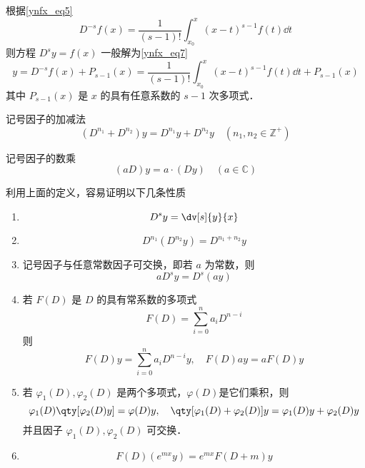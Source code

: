 根据\autoref{ynfx_eq5}~
\begin{equation}
D^{-s}f(x)=\frac{1}{(s-1)!}\int_{x_0}^x(x-t)^{s-1}f(t)\dd t
\end{equation}
则方程 $D^sy=f(x)$ 一般解为\autoref{ynfx_eq7}~
\begin{equation}
y=D^{-s}f(x)+P_{s-1}(x)=\frac{1}{(s-1)!}\int_{x_0}^x(x-t)^{s-1}f(t)\dd t+P_{s-1}(x)
\end{equation}
其中 $P_{s-1}(x)$ 是 $x$ 的具有任意系数的 $s-1$ 次多项式．
\begin{definition}{记号因子的加减法}
\begin{equation}
(D^{n_1}+D^{n_2})y=D^{n_1}y+D^{n_2}y\quad(n_1,n_2\in \mathbb{Z^{+
}})
\end{equation}
\end{definition}
\begin{definition}{记号因子的数乘}
\begin{equation}
(aD)y=a\cdot(Dy)\quad(a\in\mathbb{C})
\end{equation}
\end{definition}
利用上面的定义，容易证明以下几条性质
\begin{enumerate}
\item 
\begin{equation}
D^sy=\dv[s]{y}{x}
\end{equation}
\item 
\begin{equation}
D^{n_1}(D^{n_2}y)=D^{n_1+n_2}y
\end{equation}
\item 记号因子与任意常数因子可交换，即若 $a$ 为常数，则
\begin{equation}
aD^sy=D^s(ay)
\end{equation}
\item 若 $F(D)$ 是 $D$ 的具有常系数的多项式
\begin{equation}
F(D)=\sum_{i=0}^{n}a_iD^{n-i}
\end{equation}
则
\begin{equation}
F(D)y=\sum_{i=0}^{n}a_iD^{n-i}y,\quad F(D)ay=aF(D)y
\end{equation}
\item 若 $\varphi_1(D),\varphi_2(D)$ 是两个多项式，$\varphi(D)$是它们乘积，则
\begin{equation}
\varphi_1(D)\qty[\varphi_2(D)y]=\varphi(D)y,\quad \qty[\varphi_1(D)+\varphi_2(D)]y=\varphi_1(D)y+\varphi_2(D)y
\end{equation}
并且因子 $\varphi_1(D),\varphi_2(D)$ 可交换．
\item \begin{equation}\label{Sign_eq1}
F(D)(e^{mx}y)=e^{mx}F(D+m)y
\end{equation}
\end{enumerate}

